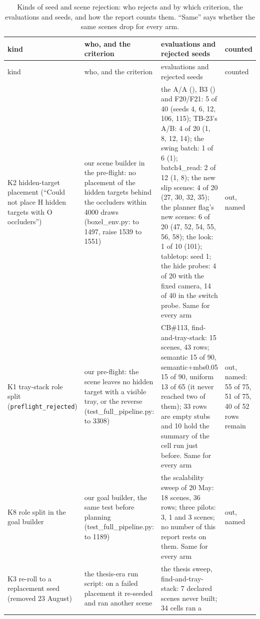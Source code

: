 \begin{footnotesize}
\begin{longtable}{@{}P{2.3cm}P{3.0cm}P{6.0cm}P{1.6cm}@{}}
\caption[Kinds of seed and scene rejection.]{Kinds of seed and scene rejection: who
rejects and by which criterion, the evaluations and seeds, and how the report counts
them. ``Same'' says whether the same scenes drop for every arm.}
\label{tab:rejections}\\
\toprule
kind & who, and the criterion & evaluations and rejected seeds & counted \\
\midrule
\endfirsthead
\toprule
kind & who, and the criterion & evaluations and rejected seeds & counted \\
\midrule
\endhead
\bottomrule
\endfoot
K2 hidden-target placement (``Could not place H hidden targets with O occluders'') &
our scene builder in the pre-flight: no placement of the hidden targets behind the
occluders within 4000 draws (boxel\_\allowbreak env.py: to 1497, raise 1539 to 1551) &
the A/A (), B3 () and F20/F21: 5 of 40 (seeds 4, 6, 12, 106, 115); TB-23's
A/B: 4 of 20 (1, 8, 12, 14); the swing batch: 1 of 6 (1); batch4\_read: 2 of 12 (1, 8);
the new slip scenes: 4 of 20 (27, 30, 32, 35); the planner flag's new scenes: 6 of 20
(47, 52, 54, 55, 56, 58); the look: 1 of 10 (101);  tabletop: seed 1; the hide
probes: 4 of 20 with the fixed camera, 14 of 40 in the switch probe. Same for every arm &
out, named \\
K1 tray-stack role split (\texttt{preflight\_\allowbreak rejected}) &
our pre-flight: the scene leaves no hidden target with a visible tray, or the reverse
(test\_full\_\allowbreak pipeline.py: to 3308) &
CB\#113, find-and-tray-stack: 15 scenes, 43 rows; semantic 15 of 90, semantic+mbs0.05
15 of 90, uniform 13 of 65 (it never reached two of them); 33 rows are empty stubs and 10
hold the summary of the cell run just before. Same for every arm &
out, named: 55 of 75, 51 of 75, 40 of 52 rows remain \\
K8 role split in the goal builder &
our goal builder, the same test before planning (test\_full\_\allowbreak pipeline.py: to 1189) &
the scalability sweep of 20 May: 18 scenes, 36 rows; three pilots: 3, 1 and 3 scenes; no
number of this report rests on them. Same for every arm &
out, named \\
K3 re-roll to a replacement seed (removed 23 August) &
the thesis-era run script: on a failed placement it re-seeded and ran another scene &
the thesis sweep, find-and-tray-stack: 7 declared scenes never built; 34 cells ran a

\end{longtable}
\end{footnotesize}
